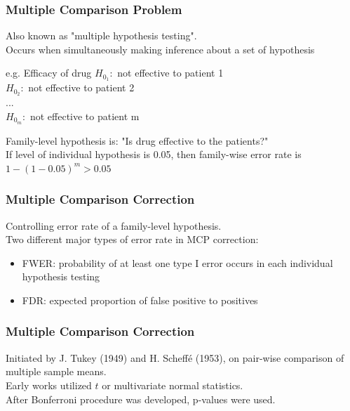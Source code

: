 \documentclass{beamer}
\begin{document}
\frame
{
  \frametitle{\LARGE{Multiple Comparison Problem}}
    Also known as "multiple hypothesis testing".\vspace{0.05in}\\
    Occurs when simultaneously making inference about a set of hypothesis
    \vspace{0.2in}\\
    
    \begin{block}{e.g. Efficacy of drug}
    \center $H_{0_1}:$ not effective to patient 1\\
    $H_{0_2}:$ not effective to patient 2\\
    ...\\
    $H_{0_m}:$ not effective to patient m\vspace{0.15in}\\
    \end{block}
    
    Family-level hypothesis is: "Is drug effective to the patients?"\\
    If level of individual hypothesis is 0.05, then family-wise error rate is $1-(1-0.05)^m > 0.05$
}

\frame
{
  \frametitle{Multiple Comparison Correction}
    Controlling error rate of a family-level hypothesis.\vspace{0.2in}\\
    Two different major types of error rate in MCP correction:
    \begin{itemize}
      \item FWER: probability of at least one type I error occurs in each individual hypothesis testing
      \item FDR: expected proportion of false positive to positives\vspace{0.2in}\\
    \end{itemize}
}

\frame
{
  \frametitle{Multiple Comparison Correction}
    Initiated by J. Tukey (1949) and H. Scheff\'e (1953), on pair-wise comparison of multiple sample means.\vspace{0.2in}\\
    
    Early works utilized $t$ or multivariate normal statistics.\vspace{0.1in}\\
    After Bonferroni procedure was developed, p-values were used.
}
\end{document}

